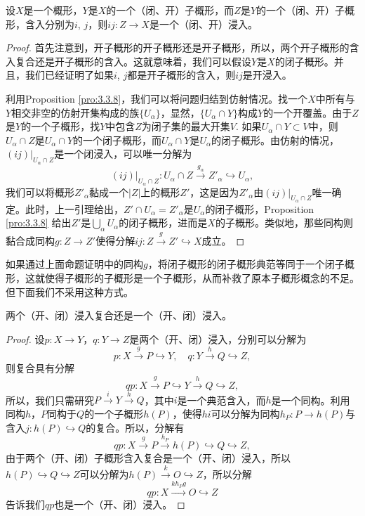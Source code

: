 \begin{pro}
	设$X$是一个概形，$Y$是$X$的一个（闭、开）子概形，而$Z$是$Y$的一个（闭、开）子概形，含入分别为$i$, $j$，则$ij:Z\to X$是一个（闭、开）浸入。
\end{pro}

\begin{proof}
首先注意到，开子概形的开子概形还是开子概形，所以，两个开子概形的含入复合还是开子概形的含入。这就意味着，我们可以假设$Y$是$X$的闭子概形。并且，我们已经证明了如果$i$, $j$都是开子概形的含入，则$ij$是开浸入。

利用Proposition \ref{pro:3.3.8}，我们可以将问题归结到仿射情况。找一个$X$中所有与$Y$相交非空的仿射开集构成的族$\{U_\alpha\}$，显然，$\{U_\alpha\cap Y\}$构成$Y$的一个开覆盖。由于$Z$是$Y$的一个子概形，找$Y$中包含$Z$为闭子集的最大开集$V$. 如果$U_\alpha\cap Y\subset V$中，则$U_\alpha\cap Z$是$U_\alpha\cap Y$的一个闭子概形，而$U_\alpha\cap Y$是$U_\alpha$的闭子概形。由仿射的情况，$(ij)|_{U_\alpha\cap Z}$是一个闭浸入，可以唯一分解为
\[
	(ij)|_{U_\alpha\cap Z}:U_\alpha\cap Z\xrightarrow{g_\alpha} Z'_\alpha \hookrightarrow U_\alpha,
\]
我们可以将概形$Z'_\alpha$黏成一个$|Z|$上的概形$Z'$，这是因为$Z'_\alpha$由$(ij)|_{U_\alpha\cap Z}$唯一确定。此时，上一引理给出，$Z'\cap U_\alpha=Z'_\alpha$是$U_\alpha$的闭子概形，Proposition \ref{pro:3.3.8} 给出$Z'$是$\bigcup_\alpha U_\alpha$的闭子概形，进而是$X$的子概形。类似地，那些同构则黏合成同构$g:Z\to Z'$使得分解$ij:Z\xrightarrow{g}Z'\hookrightarrow X$成立。
\end{proof}

如果通过上面命题证明中的同构$g$，将闭子概形的闭子概形典范等同于一个闭子概形，这就使得子概形的子概形是一个子概形，从而补救了原本子概形概念的不足。但下面我们不采用这种方式。

\begin{pro}
	两个（开、闭）浸入复合还是一个（开、闭）浸入。
\end{pro}

\begin{proof}
	设$p:X\to Y$，$q:Y\to Z$是两个（开、闭）浸入，分别可以分解为
	\[
		p:X\xrightarrow{g}P\hookrightarrow Y,\quad q:Y\xrightarrow{h}Q\hookrightarrow Z,
	\]
	则复合具有分解
	\[
		qp:X\xrightarrow{g}P\hookrightarrow Y\xrightarrow{h}Q\hookrightarrow Z,
	\]
	所以，我们只需研究$P\xrightarrow{i} Y\xrightarrow{h}Q$，其中$i$是一个典范含入，而$h$是一个同构。利用同构$h$，$P$同构于$Q$的一个子概形$h(P)$，使得$hi$可以分解为同构$h_P:P\to h(P)$与含入$j:h(P)\hookrightarrow Q$的复合。所以，分解有
	\[
		qp:X\xrightarrow{g}P\xrightarrow{h_P} h(P)\hookrightarrow Q\hookrightarrow Z,
	\]
	由于两个（开、闭）子概形含入复合是一个（开、闭）浸入，所以$h(P)\hookrightarrow Q\hookrightarrow Z$可以分解为$h(P)\xrightarrow{k}O\hookrightarrow Z$，所以分解
	\[
		qp:X\xrightarrow{kh_Pg}O\hookrightarrow Z
	\]
	告诉我们$qp$也是一个（开、闭）浸入。
\end{proof}

